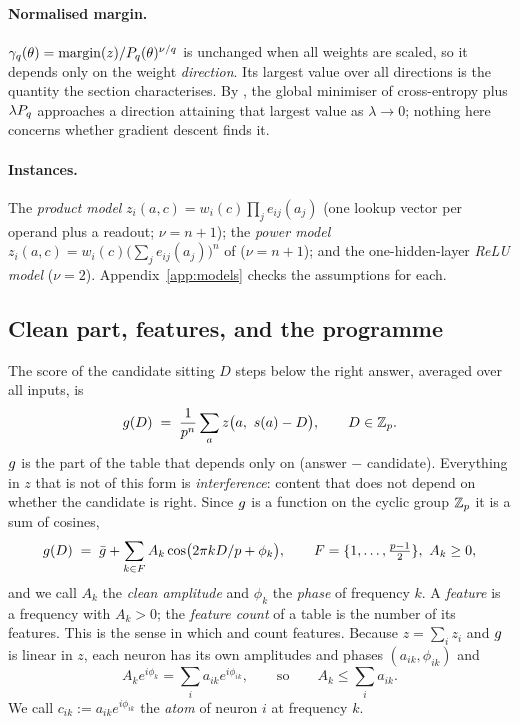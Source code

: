\paragraph{Normalised margin.} $\gamma_q(\theta)=\operatorname{margin}(z)/P_q(\theta)^{\nu/q}$ is unchanged when all
weights are scaled, so it depends only on the weight \emph{direction}. Its largest value over all
directions is the quantity the section characterises. By \citet[Thm.~4.1]{wei2019regularization}, the
global minimiser of cross-entropy plus $\lambda P_q$ approaches a direction attaining that largest
value as $\lambda\to 0$; nothing here concerns whether gradient descent finds it.

\paragraph{Instances.} The \emph{product model} $z_i(a,c)=w_i(c)\prod_j e_{ij}(a_j)$ (one lookup
vector per operand plus a readout; $\nu=n+1$); the \emph{power model}
$z_i(a,c)=w_i(c)\big(\sum_j e_{ij}(a_j)\big)^n$ of \citet{morwani2024feature,li2025nsum} ($\nu=n+1$);
and the one-hidden-layer \emph{ReLU model} ($\nu=2$). Appendix~\ref{app:models} checks the
assumptions for each.

\subsection{Clean part, features, and the programme}
\label{sec:objects}

The score of the candidate sitting $D$ steps below the right answer, averaged over all inputs, is
\begin{equation}
  \clean(D)\;=\;\frac{1}{p^n}\sum_{a} z\big(a,\ s(a)-D\big),\qquad D\in\Zp .
\end{equation}
$g$ is the part of the table that depends only on (answer $-$ candidate). Everything in $z$
that is not of this form is \emph{interference}: content that does not depend on whether the
candidate is right. Since $g$ is a function on the cyclic group $\mathbb{Z}_p$ it is a sum of cosines,
\begin{equation}
  g(D)\;=\;\bar{g}+\sum_{k\in F} A_k\cos\!\big(2\pi kD/p+\phi_k\big),\qquad
  F=\{1,\dots,\tfrac{p-1}{2}\},\ A_k\ge 0,
  \label{eq:spectrum}
\end{equation}
and we call $A_k$ the \emph{clean amplitude} and $\phi_k$ the \emph{phase} of frequency $k$. A
\emph{feature} is a frequency with $A_k>0$; the \emph{feature count} of a table is the number of its
features. This is the sense in which \citet{nanda2023progress} and \citet{morwani2024feature} count
features. Because $z=\sum_i z_i$ and $g$ is linear in $z$, each neuron has its own amplitudes and
phases $(a_{ik},\phi_{ik})$ and
\begin{equation}
  A_k e^{i\phi_k}=\sum_i a_{ik}e^{i\phi_{ik}},\qquad\text{so}\qquad A_k\le\sum_i a_{ik}.
  \label{eq:atoms}
\end{equation}
We call $c_{ik}:=a_{ik}e^{i\phi_{ik}}$ the \emph{atom} of neuron $i$ at frequency $k$.

